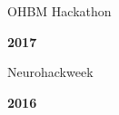 \documentclass[10pt]{article}
\newcommand{\sectionstyle}{\LARGE \fontfamily{lmr}\selectfont}
\begin{document}
\begin{minipage}[t]{.85\linewidth}
	\flushleft
	\noindent
	OHBM Hackathon
	\end{minipage}
	\hfill
	\begin{minipage}[t]{.15\linewidth}
	\flushright
	\noindent
	\textsc{\textbf{2017}}
\end{minipage}

\begin{minipage}[t]{.85\linewidth}
	\flushleft
	\noindent
	Neurohackweek
	\end{minipage}
	\hfill
	\begin{minipage}[t]{.15\linewidth}
	\flushright
	\noindent
	\textsc{\textbf{2016}}
\end{minipage}

\bigskip

\begin{center}\sectionstyle{PUBLICATIONS}\end{center}
\end{document}
